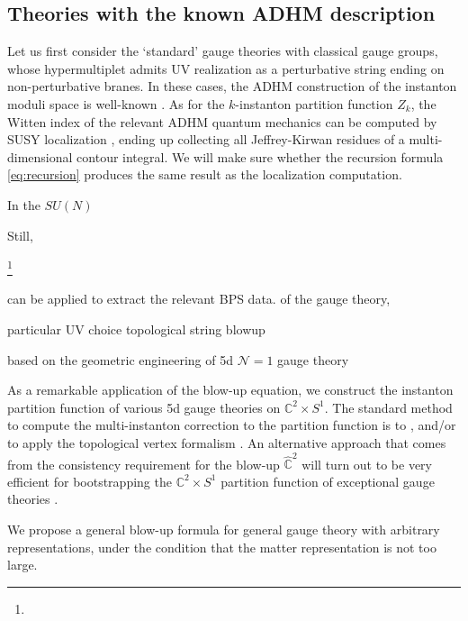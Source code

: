 \documentclass[letterpaper, 11pt]{article}
\begin{document}
{\subsection{Theories with the known ADHM description}
\label{subsec:ex-adhm}

Let us first consider the `standard' gauge theories with classical gauge groups, whose hypermultiplet admits UV realization as a perturbative string ending on non-perturbative branes. In these cases, the ADHM construction of the instanton moduli space is well-known \cite{Atiyah:1978ri,Nekrasov:2002qd,Shadchin:2005mx}. 
As for the $k$-instanton partition function $Z_k$, the Witten index of the relevant ADHM quantum mechanics can be computed by SUSY localization \cite{Kim:2011mv, Hwang:2014uwa,Hwang:2016gfw, Lee:2017lfw}, ending up collecting all Jeffrey-Kirwan residues of a multi-dimensional contour integral. We will make sure whether the recursion formula \eqref{eq:recursion} produces  the same result as the localization computation.

In the $SU(N)$


Still, 









\footnote{
  
}

can be applied to extract the relevant BPS data. 
of the gauge theory,

particular UV choice
topological string blowup



based on the geometric engineering of 5d $\mathcal{N}=1$ gauge theory \cite{Gopakumar:1998jq,Aganagic:2003db}




As a remarkable application of the blow-up equation, we construct the instanton partition function of various 5d gauge theories on $\mathbb{C}^2 \times S^1 $. The standard method to compute the multi-instanton correction to the partition function is to  , and/or to apply the topological vertex formalism . An alternative approach that comes from the consistency requirement for the blow-up $\hat{\mathbb{C}}^2$ will turn out to be very efficient for bootstrapping the $\mathbb{C}^2 \times S^1 $ partition function of exceptional gauge theories \cite{Keller:2012da, Huang:2017mis, Gu:2018gmy}.

\label{eq:d-range-nonsu}
We propose a general blow-up formula for general gauge theory with arbitrary representations, under the condition that the matter representation is not too large.


}
\end{document}
